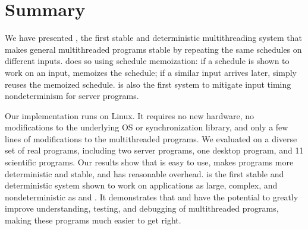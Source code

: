 \section{Summary}
\label{sec:tern-summary}

We have presented \tern, the first stable and deterministic multithreading 
system that makes general
multithreaded programs stable by repeating the same schedules on different
inputs.  \tern does so using schedule memoization: if a schedule is shown
to work on an input, \tern memoizes the schedule; if a similar input
arrives later, \tern simply reuses the memoized schedule. \tern is also the
first \dmt system to mitigate input timing nondeterminism for server
programs.

Our \tern implementation runs on Linux.  It requires no new hardware, no
modifications to the underlying OS or synchronization library, and only a
few lines of modifications to the multithreaded programs.  We evaluated
\tern on a diverse set of real programs, including two server programs, one
desktop program, and 11 scientific programs.  Our results show that
\tern is easy to use, makes programs more deterministic and stable, and has
reasonable overhead.  \tern is the first stable and deterministic system shown 
to work on
applications as large, complex, and nondeterministic as \mysql and \apache.
It demonstrates that \smt and \dmt have the potential to greatly improve
understanding, testing, and debugging of multithreaded programs, making these
programs much easier to get right.


